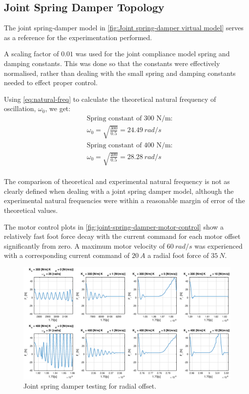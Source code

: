 \subsection{Joint Spring Damper Topology}

The joint spring-damper model in \cref{fig:Joint spring-damper virtual model} serves as a reference for the experimentation performed.

A scaling factor of $0.01$ was used for the joint compliance model spring and damping constants. This was done so that the constants were effectively normalised, rather than dealing with the small spring and damping constants needed to effect proper control.

Using \cref{eq:natural-freq} to calculate the theoretical natural frequency of oscillation, $\omega_0$, we get:
\begin{equation}
\begin{aligned}
&\text{Spring constant of 300 N/m:}\\
&\omega_0 = \sqrt{\frac{300}{0.5}} = 24.49\ rad/s\\
&\text{Spring constant of 400 N/m:}\\
&\omega_0 = \sqrt{\frac{400}{0.5}} = 28.28\ rad/s\\
\end{aligned}
\end{equation}

The comparison of theoretical and experimental natural frequency is not as clearly defined when dealing with a joint spring damper model, although the experimental natural frequencies were within a reasonable margin of error of the theoretical values.

The motor control plots in \cref{fig:joint-spring-damper-motor-control} show a relatively fast foot force decay with the current command for each motor offset significantly from zero. A maximum motor velocity of $60\ rad/s$ was experienced with a corresponding current command of $20\ A$ a radial foot force of $35\ N$.

\begin{figure}
\centering
\includegraphics[width=1\textwidth]{images/experiments/joint-spring-damper-tests.eps} 
\caption{Joint spring damper testing for radial offset.}
\label{fig:joint-spring-damper-tests}
\end{figure}


